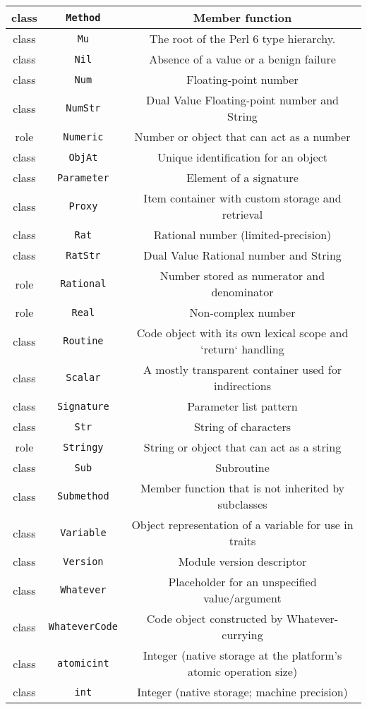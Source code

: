 \documentclass[14pt,english]{extarticle}
\providecommand{\tabularnewline}{\\}
\begin{document}
\begin{longtable}{|c|c|c|}
\hline 
{\small{}class} &
\texttt{\small{}Method} &
{\small{}Member function}\tabularnewline
\hline 
{\small{}class} &
\texttt{\small{}Mu} &
{\small{}The root of the Perl 6 type hierarchy.}\tabularnewline
\hline 
{\small{}class} &
\texttt{\small{}Nil} &
{\small{}Absence of a value or a benign failure}\tabularnewline
\hline 
{\small{}class} &
\texttt{\small{}Num} &
{\small{}Floating-point number}\tabularnewline
\hline 
{\small{}class} &
\texttt{\small{}NumStr} &
{\small{}Dual Value Floating-point number and String}\tabularnewline
\hline 
{\small{}role} &
\texttt{\small{}Numeric} &
{\small{}Number or object that can act as a number}\tabularnewline
\hline 
{\small{}class} &
\texttt{\small{}ObjAt} &
{\small{}Unique identification for an object}\tabularnewline
\hline 
{\small{}class} &
\texttt{\small{}Parameter} &
{\small{}Element of a signature}\tabularnewline
\hline 
{\small{}class} &
\texttt{\small{}Proxy} &
{\small{}Item container with custom storage and retrieval}\tabularnewline
\hline 
{\small{}class} &
\texttt{\small{}Rat} &
{\small{}Rational number (limited-precision)}\tabularnewline
\hline 
{\small{}class} &
\texttt{\small{}RatStr} &
{\small{}Dual Value Rational number and String}\tabularnewline
\hline 
{\small{}role} &
\texttt{\small{}Rational} &
{\small{}Number stored as numerator and denominator}\tabularnewline
\hline 
{\small{}role} &
\texttt{\small{}Real} &
{\small{}Non-complex number}\tabularnewline
\hline 
{\small{}class} &
\texttt{\small{}Routine} &
{\small{}Code object with its own lexical scope and `return` handling}\tabularnewline
\hline 
{\small{}class} &
\texttt{\small{}Scalar} &
{\small{}A mostly transparent container used for indirections}\tabularnewline
\hline 
{\small{}class} &
\texttt{\small{}Signature} &
{\small{}Parameter list pattern}\tabularnewline
\hline 
{\small{}class} &
\texttt{\small{}Str} &
{\small{}String of characters}\tabularnewline
\hline 
{\small{}role} &
\texttt{\small{}Stringy} &
{\small{}String or object that can act as a string}\tabularnewline
\hline 
{\small{}class} &
\texttt{\small{}Sub} &
{\small{}Subroutine}\tabularnewline
\hline 
{\small{}class} &
\texttt{\small{}Submethod} &
{\small{}Member function that is not inherited by subclasses}\tabularnewline
\hline 
{\small{}class} &
\texttt{\small{}Variable} &
{\small{}Object representation of a variable for use in traits}\tabularnewline
\hline 
{\small{}class} &
\texttt{\small{}Version} &
{\small{}Module version descriptor}\tabularnewline
\hline 
{\small{}class} &
\texttt{\small{}Whatever} &
{\small{}Placeholder for an unspecified value/argument}\tabularnewline
\hline 
{\small{}class} &
\texttt{\small{}WhateverCode} &
{\small{}Code object constructed by Whatever-currying}\tabularnewline
\hline 
{\small{}class} &
\texttt{\small{}atomicint} &
{\small{}Integer (native storage at the platform's atomic operation
size)}\tabularnewline
\hline 
{\small{}class} &
\texttt{\small{}int} &
{\small{}Integer (native storage; machine precision)}\tabularnewline
\hline 
\end{longtable}
\end{document}
